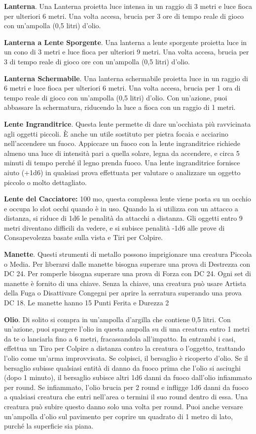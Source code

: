 \documentclass[12pt,a4paper,twoside,openany]{book}
\begin{document}
\begin{multicols}{2}
\textbf{Lanterna}. Una Lanterna proietta luce intensa in un raggio di 3 metri e luce fioca per ulteriori 6 metri. Una volta accesa, brucia per 3 ore di tempo reale di gioco con un’ampolla (0,5 litri) d’olio.


\textbf{Lanterna a Lente Sporgente}. Una lanterna a lente sporgente proietta luce in un cono di 3 metri e luce fioca per ulteriori 9 metri. Una volta accesa, brucia per 3 di tempo reale di gioco ore con un’ampolla (0,5 litri) d’olio.

\textbf{Lanterna Schermabile}. Una lanterna schermabile proietta luce in un raggio di 6 metri e luce fioca per ulteriori 6 metri. Una volta accesa, brucia per 1 ora di tempo reale di gioco con un’ampolla (0,5 litri) d’olio. Con un’azione, puoi abbassare la schermatura, riducendo la luce a fioca con un raggio di 1 metri.

\textbf{Lente Ingranditrice}. Questa lente permette di dare un’occhiata più ravvicinata agli oggetti piccoli. È anche un utile sostituto per pietra focaia e acciarino nell’accendere un fuoco. Appiccare un fuoco con la lente ingranditrice richiede almeno una luce di intensità pari a quella solare, legna da accendere, e circa 5 minuti di tempo perché il legno prenda fuoco. Una lente ingranditrice fornisce aiuto (+1d6) in qualsiasi prova effettuata per valutare o analizzare un oggetto piccolo o molto dettagliato. 

\textbf{Lente del Cacciatore:} 100 mo, questa complessa lente viene posta su un occhio e occupa lo slot occhi quando è in uso. Quando la si utilizza con un attacco a distanza, si riduce di 1d6 le penalità da attacchi a distanza. Gli oggetti entro 9 metri diventano difficili da vedere, e si subisce penalità -1d6 alle prove di Consapevolezza basate sulla vista e Tiri per Colpire.

\textbf{Manette}. Questi strumenti di metallo possono imprigionare una creatura Piccola o Media. Per liberarsi dalle manette bisogna superare una prova di Destrezza con DC 24. Per romperle bisogna superare una prova di Forza con DC 24. Ogni set di manette è fornito di una chiave. Senza la chiave, una creatura può usare Artista della Fuga o Disattivare Congegni per aprire la serratura superando una prova DC 18. Le manette hanno 15 Punti Ferita e Durezza 2

\textbf{Olio}. Di solito si compra in un’ampolla d’argilla che contiene 0,5 litri. Con un’azione, puoi spargere l’olio in questa ampolla su di una creatura entro 1 metri da te o lanciarla fino a 6 metri, fracassandola all’impatto. In entrambi i casi, effettua un Tiro per Colpire a distanza contro la creatura o l’oggetto, trattando l’olio come un’arma improvvisata. Se colpisci, il bersaglio è ricoperto d’olio. Se il bersaglio subisse qualsiasi entità di danno da fuoco prima che l’olio si asciughi (dopo 1 minuto), il bersaglio subisce altri 1d6 danni da fuoco dall’olio infiammato per round. Se infiammato, l’olio brucia per 2 round e infligge 1d6 danni da fuoco a qualsiasi creatura che entri nell’area o termini il suo round dentro di essa. Una creatura può subire questo danno solo una volta per round. Puoi anche versare un’ampolla d’olio sul pavimento per coprire un quadrato di 1 metro di lato, purché la superficie sia piana.


\end{multicols}
\end{document}
